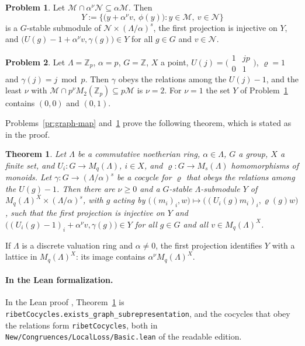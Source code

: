 \documentclass[reqno]{amsart}
\theoremstyle{definition}
\newtheorem{problem}{Problem}[section]
\theoremstyle{plain}
\newtheorem{theorem}{Theorem}[section]
\newcommand{\Z}{\mathbb{Z}}
\newcommand{\Zp}{\Z_p}
\newcommand{\mat}[4]{\bigl(\begin{smallmatrix} #1 & #2 \\ #3 & #4 \end{smallmatrix}\bigr)}
\begin{document}
\begin{problem}\label{pr:graph-AR}
Let \(\mathcal{M} \cap \alpha^\nu \mathcal{N} \subseteq \alpha\mathcal{M}\).  Then
\[
  Y := \bigl\{ \bigl(y + \alpha^\nu v,\ \phi(y)\bigr) : y \in \mathcal{M},\ v \in \mathcal{N} \bigr\}
\]
is a \(G\)-stable submodule of \(\mathcal{N} \times (\Lambda/\alpha)^s\), the first projection is injective on \(Y\), and \(\bigl(U(g) - 1 + \alpha^\nu v, \gamma(g)\bigr) \in Y\) for all \(g \in G\) and \(v \in \mathcal{N}\).
\end{problem}

\begin{problem}\label{pr:graph-toy}
Let \(\Lambda = \Zp\), \(\alpha = p\), \(G = \Z\), \(X\) a point, \(U(j) = \mat{1}{jp}{0}{1}\), \(\varrho = 1\) and \(\gamma(j) = j \bmod p\).  Then \(\gamma\) obeys the relations among the \(U(j) - 1\), and the least \(\nu\) with \(\mathcal{M} \cap p^\nu M_2(\Zp) \subseteq p\mathcal{M}\) is \(\nu = 2\).  For \(\nu = 1\) the set \(Y\) of Problem~\ref{pr:graph-AR} contains \((0, 0)\) and \((0, 1)\).
\end{problem}

Problems~\ref{pr:graph-map} and~\ref{pr:graph-AR} prove the following theorem, which is stated as in the proof.

\begin{theorem}\label{thm:graph}
Let \(\Lambda\) be a commutative noetherian ring, \(\alpha \in \Lambda\), \(G\) a group, \(X\) a finite set, and \(U_i \colon G \to M_q(\Lambda)\), \(i \in X\), and \(\varrho \colon G \to M_s(\Lambda)\) homomorphisms of monoids.  Let \(\gamma \colon G \to (\Lambda/\alpha)^s\) be a cocycle for \(\varrho\) that obeys the relations among the \(U(g) - 1\).  Then there are \(\nu \ge 0\) and a \(G\)-stable \(\Lambda\)-submodule \(Y\) of \(M_q(\Lambda)^X \times (\Lambda/\alpha)^s\), with \(g\) acting by \(\bigl((m_i)_i, w\bigr) \mapsto \bigl((U_i(g)m_i)_i, \varrho(g)w\bigr)\), such that the first projection is injective on \(Y\) and \(\bigl((U_i(g) - 1)_i + \alpha^\nu v, \gamma(g)\bigr) \in Y\) for all \(g \in G\) and all \(v \in M_q(\Lambda)^X\).
\end{theorem}

If \(\Lambda\) is a discrete valuation ring and \(\alpha \ne 0\), the first projection identifies \(Y\) with a lattice in \(M_q(\Lambda)^X\): its image contains \(\alpha^\nu M_q(\Lambda)^X\).

\paragraph{In the Lean formalization.}
In the Lean proof \cite{GL}, Theorem~\ref{thm:graph} is \texttt{ribetCocycles.exists\_graph\_subrepresentation}, and the cocycles that obey the relations form \texttt{ribetCocycles}, both in \texttt{New/Congruences/LocalLoss/Basic.lean} of the readable edition.
\end{document}
